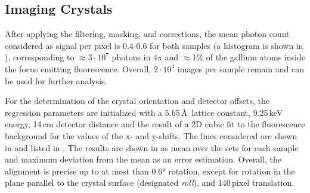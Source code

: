 \subsection{Imaging Crystals}

After applying the filtering, masking, and corrections, the mean photon count considered as signal per pixel is 0.4-0.6 for both samples (a histogram is shown in ), corresponding to $\approx 3\cdot10^7$ photons in $4\pi$ and $\approx$1\% of the gallium atoms inside the focus emitting fluorescence. Overall, $2\cdot10^4$ images per sample remain and can be used for further analysis.

For the determination of the crystal orientation and detector offsets, the regression parameters are initialized with a 5.65\,\AA\, lattice constant, 9.25\,keV energy, 14\,cm detector distance and the result of a 2D cubic fit to the fluorescence background for the values of the x- and y-shifts. The  lines considered are shown in  and listed in . The results are shown in  as mean over the sets for each sample and maximum deviation from the mean as an error estimation. Overall, the alignment is precise up to at most than 0.6° rotation, except for rotation in the plane parallel to the crystal surface (designated \textit{roll}), and 140\,pixel translation.

